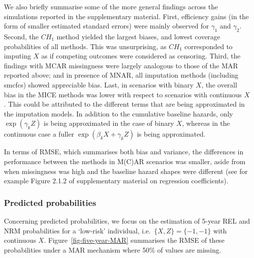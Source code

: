 \documentclass[
  letterpaper,
  paper=240mm:170mm,
  twoside=true,
  open=right,
  fontsize=10pt,
  pagesize=false,
  BCOR=15mm,
  DIV=14,
  headinclude=true,
  footinclude=false,
  headsepline=on]{scrbook}
\begin{document}
We also briefly summarise some of the more general findings across the
simulations reported in the supplementary material. First, efficiency
gains (in the form of smaller estimated standard errors) were mainly
observed for \(\gamma_1\) and \(\gamma_2\). Second, the \(CH_{1}\)
method yielded the largest biases, and lowest coverage probabilities of
all methods. This was unsurprising, as \(CH_{1}\) corresponded to
imputing \(X\) as if competing outcomes were considered as censoring.
Third, the findings with MCAR missingness were largely analogous to
those of the MAR reported above; and in presence of MNAR, all imputation
methods (including smcfcs) showed appreciable bias. Last, in scenarios
with binary \(X\), the overall bias in the MICE methods was lower with
respect to scenarios with continuous \(X\). This could be attributed to
the different terms that are being approximated in the imputation
models. In addition to the cumulative baseline hazards, only
\(\exp(\gamma_k Z)\) is being approximated in the case of binary \(X\),
whereas in the continuous case a fuller \(\exp(\beta_k X + \gamma_k Z)\)
is being approximated.

In terms of RMSE, which summarises both bias and variance, the
differences in performance between the methods in M(C)AR scenarios was
smaller, aside from when missingness was high and the baseline hazard
shapes were different (see for example Figure 2.1.2 of supplementary
material on regression coefficients).

\subsubsection{Predicted probabilities}\label{predicted-probabilities-1}

Concerning predicted probabilities, we focus on the estimation of 5-year
REL and NRM probabilities for a `low-risk' individual,
i.e.~\(\{X,Z\} = \{-1, -1\}\) with continuous \(X\).
Figure~\ref{fig-five-year-MAR} summarises the RMSE of these
probabilities under a MAR mechanism where 50\% of values are missing.
\end{document}
